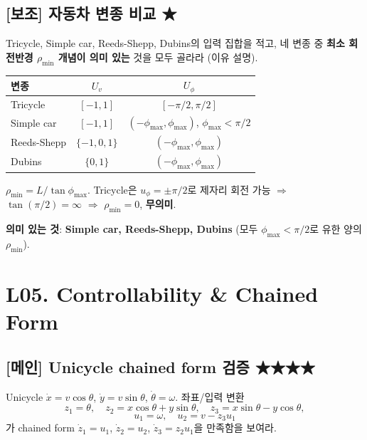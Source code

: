 \documentclass[11pt,a4paper]{article}
\begin{document}
\subsection*{[보조] 자동차 변종 비교 \hfill ★}

\begin{prob}
Tricycle, Simple car, Reeds-Shepp, Dubins의 입력 집합을 적고, 네 변종 중 \textbf{최소 회전반경 $\rho_{\min}$ 개념이 의미 있는} 것을 모두 골라라 (이유 설명).
\end{prob}

\begin{sol}
\begin{center}
\begin{tabular}{lcc}
\toprule
변종 & $U_v$ & $U_\phi$ \\
\midrule
Tricycle    & $[-1, 1]$ & $[-\pi/2, \pi/2]$ \\
Simple car  & $[-1, 1]$ & $(-\phi_{\max}, \phi_{\max})$, $\phi_{\max} < \pi/2$ \\
Reeds-Shepp & $\{-1, 0, 1\}$ & $(-\phi_{\max}, \phi_{\max})$ \\
Dubins      & $\{0, 1\}$ & $(-\phi_{\max}, \phi_{\max})$ \\
\bottomrule
\end{tabular}
\end{center}

$\rho_{\min} = L/\tan\phi_{\max}$. Tricycle은 $u_\phi = \pm\pi/2$로 제자리 회전 가능 $\Rightarrow$ $\tan(\pi/2) = \infty$ $\Rightarrow$ $\rho_{\min} = 0$, \textbf{무의미}.

\textbf{의미 있는 것}: \textbf{Simple car, Reeds-Shepp, Dubins} (모두 $\phi_{\max} < \pi/2$로 유한 양의 $\rho_{\min}$).
\end{sol}

\section{L05. Controllability \& Chained Form}

\subsection*{[메인] Unicycle chained form 검증 \hfill ★★★★}

\begin{prob}
Unicycle $\dot x = v\cos\theta$, $\dot y = v\sin\theta$, $\dot\theta = \omega$. 좌표/입력 변환
\[
z_1 = \theta,\quad z_2 = x\cos\theta + y\sin\theta,\quad z_3 = x\sin\theta - y\cos\theta,
\]
\[
u_1 = \omega,\quad u_2 = v - z_3 u_1
\]
가 chained form $\dot z_1 = u_1$, $\dot z_2 = u_2$, $\dot z_3 = z_2 u_1$을 만족함을 보여라.
\end{prob}
\end{document}
